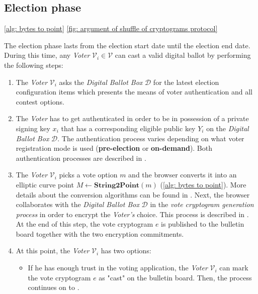 \subsection{Election phase} \label{sec: election phase}

\cref{alg: bytes to point}
\cref{fig: argument of shuffle of cryptograms protocol}

The election phase lasts from the election start date until the election end date. During this time, any \textit{Voter} $\mathcal{V}_i \in \boldsymbol{\mathcal{V}}$ can cast a valid digital ballot by performing the following steps:
\begin{enumerate}
    \item The \textit{Voter} $\mathcal{V}_i$ asks the \textit{Digital Ballot Box} $\mathcal{D}$ for the latest election configuration items which presents the means of voter authentication and all contest options.
    
    \item The \textit{Voter} has to get authenticated in order to be in possession of a private signing key $x_i$ that has a corresponding eligible public key $Y_i$ on the \textit{Digital Ballot Box} $\mathcal{D}$. The authentication process varies depending on what voter registration mode is used (\textbf{pre-election} or \textbf{on-demand}). Both authentication processes are described in .
 
    \item \label{itm: pick vote} The \textit{Voter} $\mathcal{V}_i$ picks a vote option $m$ and the browser converts it into an elliptic curve point \( M \leftarrow \mathbf{String2Point}(m) \) (\cref{alg: bytes to point}). More details about the conversion algorithms can be found in . Next, the browser collaborates with the \textit{Digital Ballot Box} $\mathcal{D}$ in the \textit{vote cryptogram generation process} in order to encrypt the \textit{Voter's} choice. This process is described in . At the end of this step, the vote cryptogram $e$ is published to the bulletin board together with the two encryption commitments.
    
    \item At this point, the \textit{Voter} $\mathcal{V}_i$ has two options:
    \begin{itemize}
        \item If he has enough trust in the voting application, the \textit{Voter} $\mathcal{V}_i$ can mark the vote cryptogram $e$ as "cast" on the bulletin board. Then, the process continues on to .
        

\end{itemize}
\end{enumerate}
